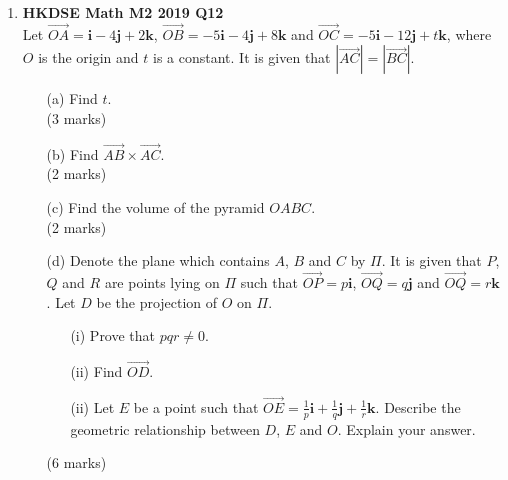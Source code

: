 \documentclass{report}
\begin{document}
\begin{enumerate}
	\item \textbf{HKDSE Math M2 2019 Q12}\\
	Let $\overrightarrow{OA} = \textbf{i} -4 \textbf{j}+ 2\textbf {k}$, $\overrightarrow{OB} = -5\textbf{i} -4 \textbf{j} +8\textbf {k}$ and $\overrightarrow{OC} = -5\textbf{i} -12 \textbf{j} +t\textbf {k}$, where $O$ is the origin and $t$ is a constant. It is given that $|\overrightarrow{AC}| = |\overrightarrow{BC}|$. 
	\begin{enumerate}
		\item [(a)]Find $t$. \\(3 marks)
		\item [(b)]Find $\overrightarrow{AB} \times \overrightarrow{AC}$. \\(2 marks)
		\item [(c)]Find the volume of the pyramid $OABC$. \\(2 marks)
		\item [(d)]Denote the plane which contains $A$, $B$ and $C$ by $\Pi$. It is given that $P$, $Q$ and $R$ are points lying on $\Pi$ such that $\overrightarrow{OP} = p\textbf{i}$, $\overrightarrow{OQ} = q\textbf{j}$ and $\overrightarrow{OQ} = r\textbf{k}$. Let $D$ be the projection of $O$ on $\Pi$.
		\begin{enumerate}
			\item [(i)]Prove that $pqr \neq 0$. 
			\item [(ii)]Find $\overrightarrow{OD}$. 
			\item [(ii)]Let $E$ be a point such that $\overrightarrow{OE} = \displaystyle\frac{1}{p}\textbf{i}+\frac{1}{q}\textbf{j}+\frac{1}{r}\textbf{k}$. Describe the geometric relationship between $D$, $E$ and $O$. Explain your answer.
		\end{enumerate}
		(6 marks)
	\end{enumerate}

\end{enumerate}
\end{document}
